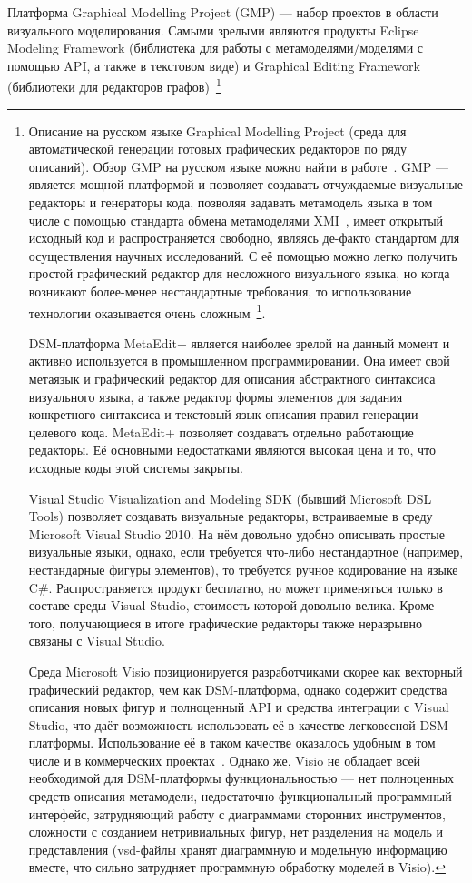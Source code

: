 \documentclass[a4paper]{article}
\begin{document}
Платформа Graphical Modelling Project (GMP) --- набор проектов в области визуального моделирования. Самыми зрелыми являются продукты Eclipse Modeling Framework (библиотека для работы с метамоделями/моделями с помощью API, а также в текстовом виде) и Graphical Editing Framework (библиотеки для редакторов графов)~\footnote{Описание на русском языке Graphical Modelling Project (среда для автоматической генерации готовых графических редакторов по ряду описаний). Обзор GMP на русском языке можно  найти в работе~\cite{SorKoz}. GMP --- является мощной платформой и  позволяет создавать отчуждаемые визуальные редакторы и генераторы кода, позволяя задавать метамодель языка в том числе с помощью стандарта обмена метамоделями XMI~\cite{xmi}, имеет открытый исходный код и распространяется свободно, являясь де-факто стандартом для осуществления научных исследований. С её помощью можно легко получить простой графический редактор для несложного визуального языка, но когда возникают более-менее нестандартные требования, то использование технологии оказывается очень сложным~\footnote{Об опыте использования графических технологий Eclipse в российских разработках см., например, работу ~\cite{Ecl}.}. 

DSM-платформа MetaEdit+ является наиболее зрелой на данный момент и активно используется в промышленном программировании. Она имеет свой метаязык и графический редактор для описания абстрактного синтаксиса визуального языка, а также редактор формы элементов для задания конкретного синтаксиса и текстовый язык описания правил генерации целевого кода. MetaEdit+ позволяет создавать отдельно работающие редакторы. Её основными недостатками являются высокая цена и то, что исходные коды этой системы закрыты.

Visual Studio Visualization and Modeling SDK (бывший Microsoft DSL Tools) позволяет создавать визуальные редакторы, встраиваемые в среду Microsoft Visual Studio 2010. На нём довольно удобно описывать простые визуальные языки, однако, если требуется что-либо нестандартное (например, нестандарные фигуры элементов), то требуется ручное кодирование на языке C\#. Распространяется продукт бесплатно, но может применяться только в составе среды Visual Studio, стоимость которой довольно велика. Кроме того, получающиеся в итоге графические редакторы также неразрывно связаны с Visual Studio.

Среда Microsoft Visio позиционируется разработчиками скорее как векторный графический редактор, чем как DSM-платформа, однако содержит средства описания новых фигур и полноценный API и средства интеграции с Visual Studio, что даёт возможность использовать её в качестве легковесной DSM-платформы. Использование её в таком качестве оказалось удобным в том числе и в коммерческих проектах~\cite{videoDsl}. Однако же, Visio не обладает всей необходимой для DSM-платформы функциональностью --- нет полноценных средств описания метамодели, недостаточно функциональный программный интерфейс, затрудняющий работу с диаграммами сторонних инструментов, сложности с созданием нетривиальных фигур, нет разделения на модель и представления (vsd-файлы хранят диаграммную и модельную информацию вместе, что сильно затрудняет программную обработку моделей в Visio). 


}
\end{document}
